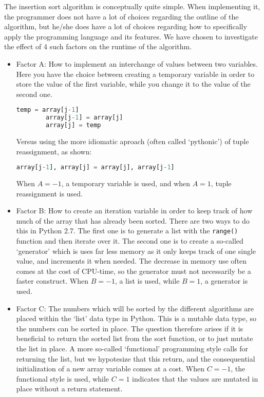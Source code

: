 The insertion sort algorithm is conceptually quite simple. When implementing it, the programmer does not have a lot of choices regarding the outline of the algorithm, but he/she does have a lot of choices regarding how to specifically apply the programming language and its features. We have chosen to investigate the effect of 4 such factors on the runtime of the algorithm.    

\begin{itemize}
    \item Factor A: How to implement an interchange of values between two variables. Here you have the choice between creating a temporary variable in order to store the value of the first variable, while you change it to the value of the second one.
    \begin{lstlisting}[language=Python]
        temp = array[j-1]
        array[j-1] = array[j]
        array[j] = temp
    \end{lstlisting}
    Versus using the more idiomatic aproach (often called `pythonic') of tuple reassignment, as shown:
    \begin{lstlisting}[language=Python]
        array[j-1], array[j] = array[j], array[j-1]
    \end{lstlisting}
    When $A=-1$, a temporary variable is used, and when $A=1$, tuple reassignment is used.
 
    \item Factor B: How to create an iteration variable in order to keep track of how much of the array that has already been sorted. There are two ways to do this in Python 2.7. The first one is to generate a list with the \texttt{range()} function and then iterate over it. The second one is to create a so-called `generator' which is uses far less memory as it only keeps track of one single value, and increments it when needed. The decrease in memory use often comes at the cost of CPU-time, so the generator must not necessarily be a faster construct. When $B=-1$, a list is used, while $B=1$, a generator is used.
    
    \item Factor C: The numbers which will be sorted by the different algorithms are placed within the `list' data type in Python. This is a mutable data type, so the numbers can be sorted in place. The question therefore arises if it is beneficial to return the sorted list from the sort function, or to just mutate the list in place. A more so-called `functional' programming style calls for returning the list, but we hypotesize that this return, and the consequential initialization of a new array variable comes at a cost. When $C=-1$, the functional style is used, while $C=1$ indicates that the values are mutated in place without a return statement.
    

\end{itemize}
